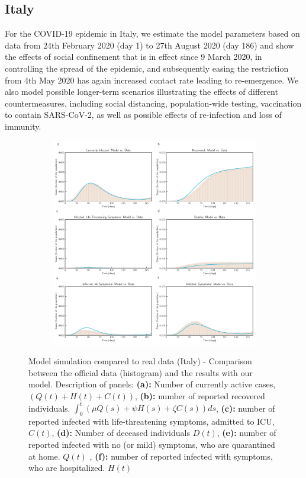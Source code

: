 \documentclass[authoryear,preprint]{elsarticle}
\begin{document}
\subsection{Italy}
For the COVID-19 epidemic in Italy, we estimate the model parameters based on data from 24th February 2020 (day 1) to 27th August 2020 (day 186) and show the effects of social confinement that is in effect since 9 March 2020, in controlling the spread of the epidemic, and subsequently easing the restriction from 4th May 2020 has again increased contact rate leading to re-emergence. We also model possible longer-term scenarios illustrating the effects of different countermeasures, including social distancing, population-wide testing, vaccination to contain SARS-CoV-2, as well as possible effects of re-infection and loss of immunity.
%
%
\begin{figure}[t!]
	\centering
	\begin{subfigure}[b]{\textwidth}
		\centering
		\includegraphics[width=\linewidth]{Italy_plot_model_data.pdf}
	\end{subfigure}
	\caption{Model simulation compared to real data (Italy) - Comparison between the official data (histogram) and the results with our model. Description of panels: \textbf{(a):} Number of currently active cases, $\left( Q(t) + H(t) + C(t)\right)$, \textbf{(b):} number of reported recovered individuals. $\int_{0}^{t}{\left( \mu Q(s) + \psi H(s) + \zeta  C(s) \right) ds}$, \textbf{(c):} number of reported infected with life-threatening symptoms, admitted to ICU, $C(t)$, \textbf{(d):} Number of deceased individuals $D(t)$, \textbf{(e):} number of reported infected with no (or mild) symptoms, who are quarantined at home. $Q(t)$ , \textbf{(f):} number of reported infected with symptoms, who are hospitalized. $H(t)$}
	\label{fig2A} 
\end{figure}
%
\end{document}
